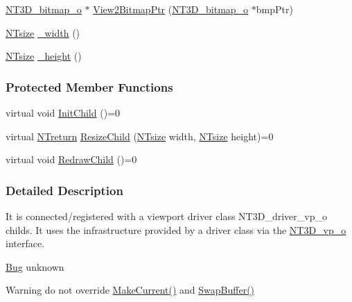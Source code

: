\begin{DoxyCompactItemize}
\item 
\hyperlink{class_n_t3_d__bitmap__o}{NT3D\_\-bitmap\_\-o} $\ast$ \hyperlink{class_n_t3_d__abstract__vp__o_ac04447c4fb5bd6f18aba4454bc63327e}{View2BitmapPtr} (\hyperlink{class_n_t3_d__bitmap__o}{NT3D\_\-bitmap\_\-o} $\ast$bmpPtr)
\item 
\hyperlink{nt__types_8h_a06c124f2e4469769b58230253ce0560b}{NTsize} \hyperlink{class_n_t3_d__abstract__vp__o_a17780c3a1c28c474fcca579843a9bc78}{\_\-width} ()
\item 
\hyperlink{nt__types_8h_a06c124f2e4469769b58230253ce0560b}{NTsize} \hyperlink{class_n_t3_d__abstract__vp__o_a4b70e023af30dfdca5c636d3651f6a54}{\_\-height} ()
\end{DoxyCompactItemize}
\subsubsection*{Protected Member Functions}
\begin{DoxyCompactItemize}
\item 
virtual void \hyperlink{class_n_t3_d__abstract__vp__o_a044f98747f0be214d62876869a0192db}{InitChild} ()=0
\item 
virtual \hyperlink{nt__types_8h_ab9564ee8f091e809d21b8451c6683c53}{NTreturn} \hyperlink{class_n_t3_d__abstract__vp__o_ab97005b21dd58269565426099a0fe77b}{ResizeChild} (\hyperlink{nt__types_8h_a06c124f2e4469769b58230253ce0560b}{NTsize} width, \hyperlink{nt__types_8h_a06c124f2e4469769b58230253ce0560b}{NTsize} height)=0
\item 
virtual void \hyperlink{class_n_t3_d__abstract__vp__o_a440f6b8f70ab998f06c3685e64aa44b7}{RedrawChild} ()=0
\end{DoxyCompactItemize}


\subsubsection{Detailed Description}
It is connected/registered with a viewport driver class NT3D\_\-driver\_\-vp\_\-o childs. It uses the infrastructure provided by a driver class via the \hyperlink{class_n_t3_d__vp__o}{NT3D\_\-vp\_\-o} interface. \begin{Desc}
\item[\hyperlink{bug__bug000002}{Bug}]unknown \end{Desc}
\begin{DoxyWarning}{Warning}
do not override \hyperlink{class_n_t3_d__abstract__vp__o_ab4537da43a1de2dce6ea0119df8446b7}{MakeCurrent()} and \hyperlink{class_n_t3_d__abstract__vp__o_adc452610655e9ce8ac6d91fb2f30735b}{SwapBuffer()} 
\end{DoxyWarning}



